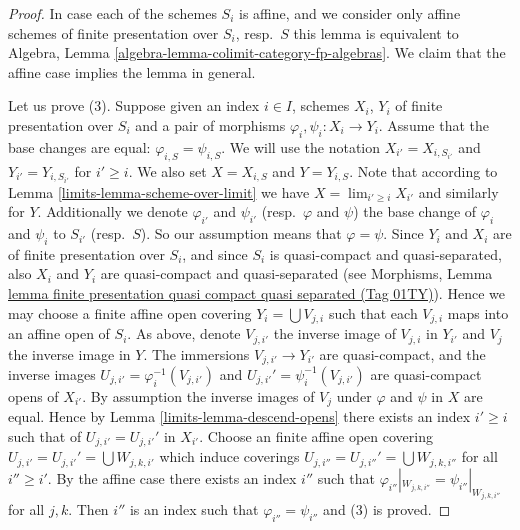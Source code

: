 \documentclass{amsart}
\theoremstyle{plain}
\theoremstyle{definition}
\theoremstyle{remark}
\numberwithin{equation}{subsection}
\def\lim{\mathop{\mathrm{lim}}\nolimits}
\begin{document}
\begin{proof}
In case each of the schemes $S_i$ is affine, and we consider
only affine schemes of finite presentation over $S_i$, resp.\ $S$
this lemma is equivalent to
Algebra, Lemma \ref{algebra-lemma-colimit-category-fp-algebras}.
We claim that the affine case implies the lemma in general.

\medskip\noindent
Let us prove (3). Suppose given an index $i \in I$, schemes
$X_i$, $Y_i$ of finite presentation over $S_i$ and a pair of morphisms
$\varphi_i, \psi_i : X_i \to Y_i$. Assume that the base changes are
equal: $\varphi_{i, S} = \psi_{i, S}$. We will use the notation
$X_{i'} = X_{i, S_{i'}}$ and $Y_{i'} = Y_{i, S_{i'}}$ for
$i' \geq i$. We also set $X = X_{i, S}$ and $Y = Y_{i, S}$.
Note that according to Lemma \ref{limits-lemma-scheme-over-limit} we have
$X = \lim_{i' \geq i} X_{i'}$ and similarly for $Y$.
Additionally we denote $\varphi_{i'}$ and $\psi_{i'}$
(resp.\ $\varphi$ and $\psi$)
the base change of $\varphi_i$ and $\psi_i$ to $S_{i'}$
(resp.\ $S$). So our assumption means that $\varphi = \psi$.
Since $Y_i$ and $X_i$ are of finite presentation
over $S_i$, and since $S_i$ is quasi-compact and quasi-separated, also
$X_i$ and $Y_i$ are quasi-compact and quasi-separated
(see Morphisms,
Lemma \href{https://stacks.math.columbia.edu/tag/01TY}{lemma finite presentation quasi compact quasi separated (Tag 01TY)}).
Hence we may choose a finite affine open covering
$Y_i = \bigcup V_{j, i}$ such that each $V_{j, i}$ maps into
an affine open of $S_i$. As above, denote $V_{j, i'}$ the inverse
image of $V_{j, i}$ in $Y_{i'}$ and $V_j$ the inverse image in $Y$.
The immersions $V_{j, i'} \to Y_{i'}$ are quasi-compact, and the inverse images
$U_{j, i'} = \varphi_i^{-1}(V_{j, i'})$ and
$U_{j, i'}' = \psi_i^{-1}(V_{j, i'})$
are quasi-compact opens of $X_{i'}$. By assumption the inverse images of
$V_j$ under $\varphi$ and $\psi$ in $X$ are equal.
Hence by Lemma \ref{limits-lemma-descend-opens}
there exists an index $i' \geq i$ such that
of $U_{j, i'} = U_{j, i'}'$ in $X_{i'}$.
Choose an finite affine open covering
$U_{j, i'} = U_{j, i'}' = \bigcup W_{j, k, i'}$
which induce coverings $U_{j, i''} = U_{j, i''}' = \bigcup W_{j, k, i''}$
for all $i'' \geq i'$.
By the affine case there exists
an index $i''$ such that
$\varphi_{i''}|_{W_{j, k, i''}} = \psi_{i''}|_{W_{j, k, i''}}$
for all $j, k$. Then $i''$ is an index such that
$\varphi_{i''} = \psi_{i''}$ and (3) is proved.


\end{proof}
\end{document}
